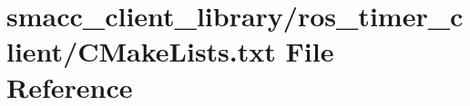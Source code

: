 \hypertarget{client__library_2ros__timer__client_2CMakeLists_8txt}{}\section{smacc\+\_\+client\+\_\+library/ros\+\_\+timer\+\_\+client/\+C\+Make\+Lists.txt File Reference}
\label{client__library_2ros__timer__client_2CMakeLists_8txt}
